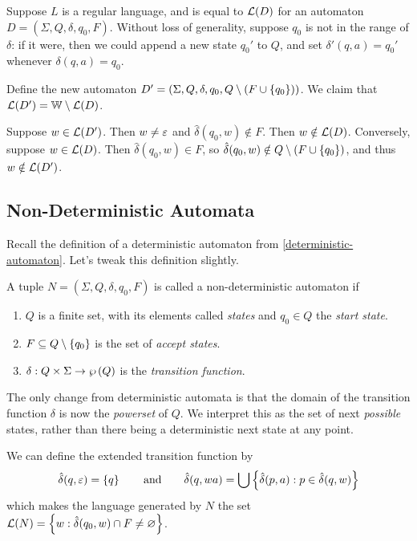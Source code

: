 \documentclass{article}
\begin{document}
\begin{prf}
	Suppose $L$ is a regular language, and is equal to $\mathcal{L}(D)$ for an automaton $D = (\Sigma, Q, \delta, q_0, F)$. Without loss of generality, suppose $q_0$ is not in the range of $\delta$: if it were, then we could append a new state $q_0'$ to $Q$, and set $\delta'(q, a) = q_0'$ whenever $\delta(q, a) = q_0$.
	    
	Define the new automaton $D' = (\Sigma, Q, \delta, q_0, Q \setminus (F \cup \left\lbrace q_0 \right\rbrace))$. We claim that $\mathcal{L}(D') = \mathbb{W} \setminus \mathcal{L}(D)$.
	    
	Suppose $w \in \mathcal{L}(D')$. Then $w \neq \varepsilon$ and $\hat{\delta}(q_0, w) \notin F$. Then $w \notin \mathcal{L}(D)$. Conversely, suppose $w \in \mathcal{L}(D)$. Then $\hat{\delta}(q_0, w) \in F$, so $\hat{\delta}(q_0, w) \notin Q \setminus (F \cup \left\lbrace q_0 \right\rbrace)$, and thus $w \notin \mathcal{L}(D')$.
\end{prf}

\subsection{Non-Deterministic Automata}

Recall the definition of a deterministic automaton from \ref{deterministic-automaton}. Let's tweak this definition slightly.

\begin{definition}
	\label{non-deterministic-automaton}
	A tuple $N = (\Sigma, Q, \delta, q_0, F)$ is called a non-deterministic automaton if
	\begin{enumerate}
		\item $Q$ is a finite set, with its elements called \textit{states} and $q_0 \in Q$ the \textit{start state}.
		\item $F \subseteq Q \setminus \left\lbrace q_0 \right\rbrace$ is the set of \textit{accept states}.
		\item $\delta: Q \times \Sigma \to \wp\left(Q\right)$ is the \textit{transition function}.
	\end{enumerate}
	The only change from deterministic automata is that the domain of the transition function $\delta$ is now the \textit{powerset} of $Q$. We interpret this as the set of next \textit{possible} states, rather than there being a deterministic next state at any point.
\end{definition}

We can define the extended transition function by
\[
	\hat{\delta}(q, \varepsilon) = \left\lbrace q \right\rbrace \qquad \text{and} \qquad \hat{\delta}(q, wa) = \bigcup \left\lbrace \hat{\delta}(p, a): p \in \hat{\delta}(q, w) \right\rbrace
\]
which makes the language generated by $N$ the set $\mathcal{L}(N) = \left\lbrace w: \hat{\delta}(q_0, w) \cap F \neq \varnothing \right\rbrace$.
\end{document}
